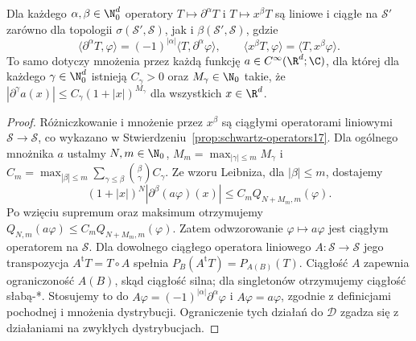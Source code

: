 \begin{twierdzenie}
\label{thm:tempered-operators22}
Dla każdego $\alpha,\beta\in\N_0^d$ operatory
$T\mapsto\partial^\alpha T$ i $T\mapsto x^\beta T$
są liniowe i ciągłe na $\mathcal S'$ zarówno dla topologii
$\sigma(\mathcal S',\mathcal S)$, jak i
$\beta(\mathcal S',\mathcal S)$, gdzie
\[
\langle\partial^\alpha T,\varphi\rangle
=(-1)^{|\alpha|}\langle T,\partial^\alpha\varphi\rangle,
\qquad\langle x^\beta T,\varphi\rangle
=\langle T,x^\beta\varphi\rangle.
\]
To samo dotyczy mnożenia przez każdą funkcję
$a\in C^\infty(\R^d;\C)$, dla której dla każdego
$\gamma\in\N_0^d$ istnieją $C_\gamma>0$ oraz
$M_\gamma\in\N_0$ takie, że
$|\partial^\gamma a(x)|\le C_\gamma(1+|x|)^{M_\gamma}$
dla wszystkich $x\in\R^d$.
\end{twierdzenie}
\begin{proof}
Różniczkowanie i mnożenie przez $x^\beta$ są ciągłymi
operatorami liniowymi $\mathcal S\to\mathcal S$,
co wykazano w Stwierdzeniu~\ref{prop:schwartz-operators17}.
Dla ogólnego mnożnika $a$ ustalmy $N,m\in\N_0$,
$M_m=\max_{|\gamma|\le m}M_\gamma$ i
$C_m=\max_{|\beta|\le m}\sum_{\gamma\le\beta}
\binom\beta\gamma C_\gamma$.
Ze wzoru Leibniza, dla $|\beta|\le m$, dostajemy
\[
 (1+|x|)^N|\partial^\beta(a\varphi)(x)|
 \le C_m Q_{N+M_m,m}(\varphi).
\]
Po wzięciu supremum oraz maksimum otrzymujemy
$Q_{N,m}(a\varphi)\le C_m Q_{N+M_m,m}(\varphi)$.
Zatem odwzorowanie $\varphi\mapsto a\varphi$ jest
ciągłym operatorem na $\mathcal S$.
Dla dowolnego ciągłego operatora liniowego
$A:\mathcal S\to\mathcal S$ jego transpozycja
$A^{\mathrm t}T=T\circ A$ spełnia
$P_B(A^{\mathrm t}T)=P_{A(B)}(T)$.
Ciągłość $A$ zapewnia ograniczoność $A(B)$, skąd
ciągłość silna; dla singletonów otrzymujemy ciągłość
słabą-*. Stosujemy to do $A\varphi=(-1)^{|\alpha|}
\partial^\alpha\varphi$ i $A\varphi=a\varphi$,
zgodnie z definicjami pochodnej i mnożenia dystrybucji.
Ograniczenie tych działań do $\mathcal D$ zgadza się
z działaniami na zwykłych dystrybucjach.
\end{proof}

